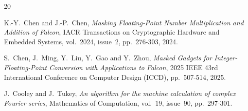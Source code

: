 \documentclass{llncs}
\begin{document}
\begin{thebibliography}{20}

K.-Y.~Chen and J.-P.~Chen,
\emph{Masking Floating-Point Number Multiplication and Addition of Falcon},
IACR Transactions on Cryptographic Hardware and Embedded Systems,
vol.~2024, issue~2, pp.~276-303, 2024.

S.~Chen, J.~Ming, Y.~Liu, Y.~Gao and Y.~Zhou,
\emph{Masked Gadgets for Integer-Floating-Point Conversion with
Applications to Falcon},
2025 IEEE 43rd International Conference on Computer Design (ICCD),
pp.~507-514, 2025.





J.~Cooley and J.~Tukey,
\emph{An algorithm for the machine calculation of complex Fourier series},
Mathematics of Computation, vol.~19, issue~90, pp.~297-301.





\end{thebibliography}
\end{document}
